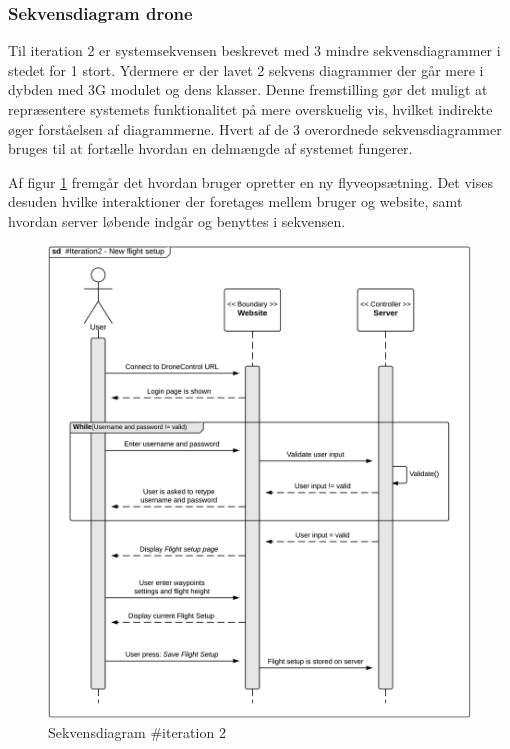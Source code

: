 \subsubsection*{Sekvensdiagram drone}

Til iteration 2 er systemsekvensen beskrevet med 3 mindre sekvensdiagrammer i stedet for 1 stort. Ydermere er der lavet 2 sekvens diagrammer der går mere i dybden med 3G modulet og dens klasser. 
Denne fremstilling gør det muligt at repræsentere systemets funktionalitet på mere overskuelig vis, hvilket indirekte øger forståelsen af diagrammerne. Hvert af de 3 overordnede sekvensdiagrammer bruges til at fortælle hvordan en delmængde af systemet fungerer.

Af figur \ref{fig:Sekvens_diagram_iteration2_1} fremgår det hvordan bruger opretter en ny flyveopsætning. Det vises desuden hvilke interaktioner der foretages mellem bruger og website, samt hvordan server løbende indgår og benyttes i sekvensen. 

\begin{figure}[H]
	\centering
	\includegraphics[width=1\textwidth]{Billeder/sekvens/sekvens_iteration2_1}
	\caption{Sekvensdiagram \#iteration 2}
	\label{fig:Sekvens_diagram_iteration2_1}
\end{figure}


